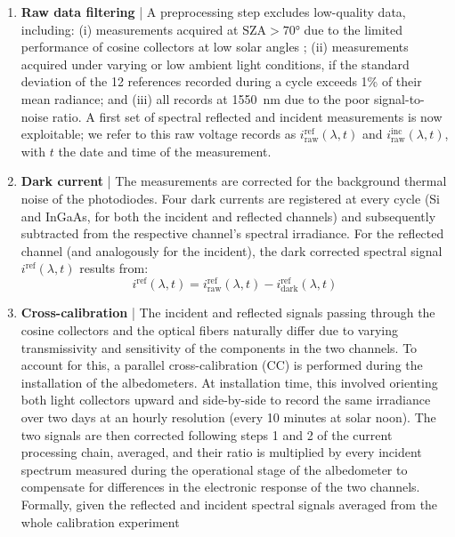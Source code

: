 \documentclass[11pt,a4paper]{article}
\newcommand{\sza}{\mathrm{SZA}}
\begin{document}
\begin{enumerate}[align=right,itemindent=2em,labelsep=4pt,labelwidth=1em,leftmargin=0pt,nosep]
	\item \textbf{Raw data filtering} |
	A preprocessing step excludes low-quality data, including: (i) measurements acquired at $\sza > \ang{70}$ due to the limited performance of cosine collectors at low solar angles \parencite{picardDevelopmentCalibrationAutomatic2016a}; (ii) measurements acquired under varying or low ambient light conditions, if the standard deviation of the 12 references recorded during a cycle exceeds 1\% of their mean radiance; and (iii) all records at \qty{1550}{\nano\meter} due to the poor signal-to-noise ratio. A first set of spectral reflected and incident measurements is now exploitable; we refer to this raw voltage records as $i_{\mathrm{raw}}^{\mathrm{ref}}(\lambda, t)$ and $i_{\mathrm{raw}}^{\mathrm{inc}}(\lambda, t)$, with $t$ the date and time of the measurement.
	\item \textbf{Dark current} |
	The measurements are corrected for the background thermal noise of the photodiodes. Four dark currents are registered at every cycle (Si and InGaAs, for both the incident and reflected channels) and subsequently subtracted from the respective channel's spectral irradiance. For the reflected channel (and analogously for the incident), the dark corrected spectral signal $i^{\mathrm{ref}}(\lambda, t)$ results from:
	\begin{equation}
		i^{\mathrm{ref}}(\lambda, t) = i_{\mathrm{raw}}^{\mathrm{ref}}(\lambda, t) - i_{\mathrm{dark}}^{\mathrm{ref}}(\lambda, t)
	\end{equation}
	\item \textbf{Cross-calibration} |
	The incident and reflected signals passing through the cosine collectors and the optical fibers naturally differ due to varying transmissivity and sensitivity of the components in the two channels. To account for this, a parallel cross-calibration (CC) is performed during the installation of the albedometers. At installation time, this involved orienting both light collectors upward and side-by-side to record the same irradiance over two days at an hourly resolution (every 10 minutes at solar noon). The two signals are then corrected following steps 1 and 2 of the current processing chain, averaged, and their ratio is multiplied by every incident spectrum measured during the operational stage of the albedometer to compensate for differences in the electronic response of the two channels. Formally, given the reflected and incident spectral signals averaged from the whole calibration experiment

\end{enumerate}
\end{document}
